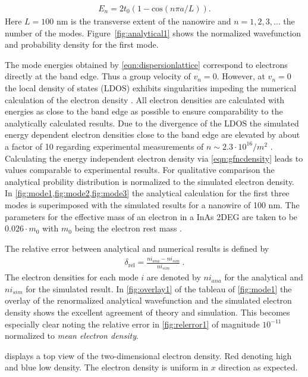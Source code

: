 \begin{align}
E_{n} = 2t_0(1-\text{cos}(n\pi a/L)).
\label{eqn:dispersionlattice}
\end{align}
Here $L=100$ nm is the transverse extent of the nanowire and $n=1,2,3,\dotsc$ the number of the modes. Figure~\ref{fig:analytical1} shows the normalized wavefunction and probability density for the first mode.\par
The mode energies obtained by \cref{eqn:dispersionlattice} correspond to electrons directly at the band edge. Thus a group velocity of $v_n=0$. However, at $v_n=0$ the local density of states (LDOS) exhibits singularities \cite{ghasemi:69010R} impeding the numerical calculation of the electron density \cite{Wimmer2009Thesis}.
All electron densities are calculated with energies as close to the band edge as possible to ensure comparability to the analytically calculated results. Due to the divergence of the LDOS the simulated energy dependent electron densities close to the band edge are elevated by about a factor of 10 regarding experimental measurements of $n \sim2.3\cdot 10^{16}/m^2$ \cite{gelfand2006} \cite{JJAP.26.L59}. Calculating the energy independent electron density via \cref{eqn:gfncdensity} leads to values comparable to experimental results. For qualitative comparison the analytical probility distribution is normalized to the simulated electron density.
In \cref{fig:mode1,fig:mode2,fig:mode3} the analytical calculation for the first three modes is superimposed with the simulated results for a nanowire of 100 nm. 
The parameters for the effective mass of an electron in a InAs 2DEG are taken to be $0.026\cdot m_0$ with $m_0$ being the electron rest mass \cite{PhysRev.105.460}.\par
The relative error between analytical and numerical results is defined by
\begin{align}
\delta_{\text{rel}} = \frac{ni_{ana}-ni_{sim}}{ni_{sim}}\ .
\end{align}
The electron densities for each mode $i$ are denoted by $ni_{ana}$ for the analytical and $ni_{sim}$ for the simulated result.
In \cref{fig:overlay1} of the tableau of \cref{fig:mode1} the overlay of the renormalized analytical wavefunction and the simulated electron density shows the excellent agreement of theory and simulation. This becomes especially clear noting the relative error in \cref{fig:relerror1} of magnitude $10^{-11}$ normalized to \emph{mean electron density}.\par
{} displays a top view of the two-dimensional electron density. Red denoting high and blue low density. The electron density is uniform in $x$ direction as expected.\par
